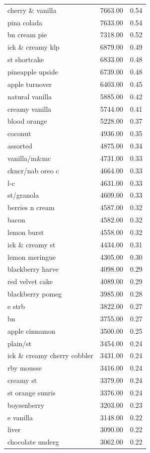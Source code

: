 \begin{table}
\begin{tabular}{lrr}
cherry \& vanilla & 7663.00 & 0.54 \\
pina colada & 7633.00 & 0.54 \\
bn cream pie & 7318.00 & 0.52 \\
ick \& creamy klp & 6879.00 & 0.49 \\
st shortcake & 6833.00 & 0.48 \\
pineapple upside & 6739.00 & 0.48 \\
apple turnover & 6403.00 & 0.45 \\
natural vanilla & 5885.00 & 0.42 \\
creamy vanilla & 5744.00 & 0.41 \\
blood orange & 5228.00 & 0.37 \\
coconut & 4936.00 & 0.35 \\
assorted & 4875.00 & 0.34 \\
vanilla/m\&mc & 4731.00 & 0.33 \\
ckncr/nab oreo c & 4664.00 & 0.33 \\
l-c & 4631.00 & 0.33 \\
st/granola & 4609.00 & 0.33 \\
berries n cream & 4587.00 & 0.32 \\
bacon & 4582.00 & 0.32 \\
lemon burst & 4558.00 & 0.32 \\
ick \& creamy st & 4434.00 & 0.31 \\
lemon meringue & 4305.00 & 0.30 \\
blackberry harve & 4098.00 & 0.29 \\
red velvet cake & 4089.00 & 0.29 \\
blackberry pomeg & 3985.00 & 0.28 \\
e strb & 3822.00 & 0.27 \\
bn & 3755.00 & 0.27 \\
apple cinnamon & 3500.00 & 0.25 \\
plain/st & 3454.00 & 0.24 \\
ick \& creamy cherry cobbler & 3431.00 & 0.24 \\
rby mousse & 3416.00 & 0.24 \\
creamy st & 3379.00 & 0.24 \\
st orange sunris & 3376.00 & 0.24 \\
boysenberry & 3203.00 & 0.23 \\
e vanilla & 3148.00 & 0.22 \\
liver & 3090.00 & 0.22 \\
chocolate underg & 3062.00 & 0.22 \\

\end{tabular}
\end{table}
